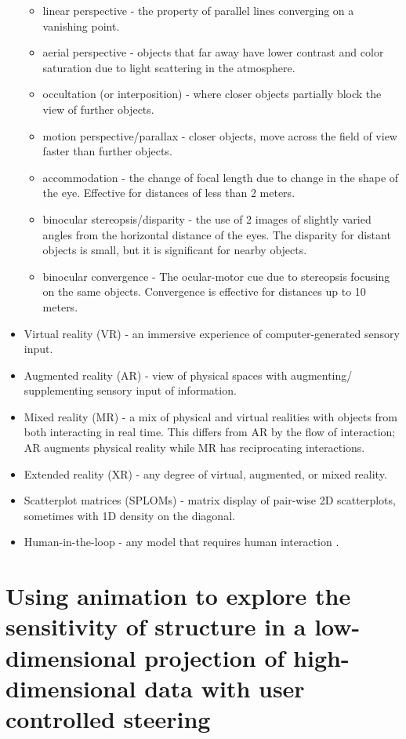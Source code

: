 \documentclass{monashthesis}
\begin{document}
\begin{itemize}
  \begin{itemize}
  \tightlist
  \item
    linear perspective - the property of parallel lines converging on a
    vanishing point.
  \item
    aerial perspective - objects that far away have lower contrast and
    color saturation due to light scattering in the atmosphere.
  \item
    occultation (or interposition) - where closer objects partially
    block the view of further objects.
  \item
    motion perspective/parallax - closer objects, move across the field
    of view faster than further objects.
  \item
    accommodation - the change of focal length due to change in the
    shape of the eye. Effective for distances of less than 2 meters.
  \item
    binocular stereopsis/disparity - the use of 2 images of slightly
    varied angles from the horizontal distance of the eyes. The
    disparity for distant objects is small, but it is significant for
    nearby objects.
  \item
    binocular convergence - The ocular-motor cue due to stereopsis
    focusing on the same objects. Convergence is effective for distances
    up to 10 meters.
  \end{itemize}
\item
  Virtual reality (VR) - an immersive experience of computer-generated
  sensory input.
\item
  Augmented reality (AR) - view of physical spaces with augmenting/
  supplementing sensory input of information.
\item
  Mixed reality (MR) - a mix of physical and virtual realities with
  objects from both interacting in real time. This differs from AR by
  the flow of interaction; AR augments physical reality while MR has
  reciprocating interactions.
\item
  Extended reality (XR) - any degree of virtual, augmented, or mixed
  reality.
\item
  Scatterplot matrices (SPLOMs) - matrix display of pair-wise 2D
  scatterplots, sometimes with 1D density on the diagonal.
\item
  Human-in-the-loop - any model that requires human interaction
  \autocite{karwowski_international_2006}.
\end{itemize}

\chapter{Using animation to explore the sensitivity of structure in a
low-dimensional projection of high-dimensional data with user controlled
steering}\label{ch:spinifex}
\end{document}
